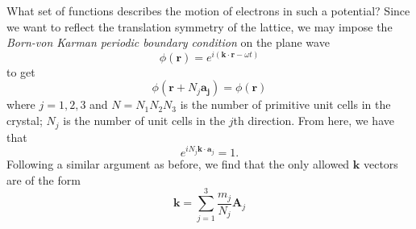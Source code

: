 \documentclass{book}
\theoremstyle{definition}
\newcommand{\f}[2]{\frac{#1}{#2}}
\begin{document}
What set of functions describes the motion of electrons in such a potential? Since we want to reflect the translation symmetry of the lattice, we may impose the \textit{Born-von Karman periodic boundary condition} on the plane wave 
\begin{equation*}
\phi(\mathbf{r}) = e^{i(\mathbf{k}\cdot \mathbf{r} - \omega t)}
\end{equation*}
to get
\begin{equation*}
\phi(\mathbf{r} + N_j \mathbf{a_j}) = \phi(\mathbf{r})
\end{equation*}
where $j=1,2,3$ and $N = N_1N_2N_3$ is the number of primitive unit cells in the crystal; $N_j$ is the number of unit cells in the $j$th direction. From here, we have that 
\begin{equation*}
e^{iN_j \mathbf{k}\cdot \mathbf{a}_j} = 1.
\end{equation*}
Following a similar argument as before, we find that the only allowed $\mathbf{k}$ vectors are of the form
\begin{equation*}
\mathbf{k} = \sum^3_{j=1}\f{m_j}{N_j}\mathbf{A}_j
\end{equation*}
\end{document}
